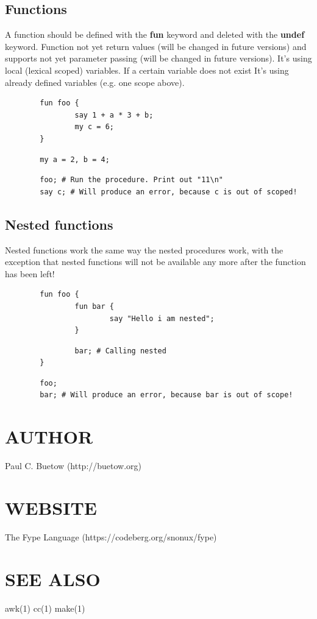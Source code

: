 \subsection*{Functions\label{Functions}}


A function should be defined with the \textbf{fun} keyword and deleted with the \textbf{undef} keyword. Function not yet return values (will be changed in future versions) and supports not yet parameter passing (will be changed in future versions). It's using local (lexical scoped) variables. If a certain variable does not exist It's using already defined variables (e.g. one scope above).

\begin{verbatim}
        fun foo {
                say 1 + a * 3 + b;
                my c = 6;
        }
\end{verbatim}
\begin{verbatim}
        my a = 2, b = 4;
\end{verbatim}
\begin{verbatim}
        foo; # Run the procedure. Print out "11\n"
        say c; # Will produce an error, because c is out of scoped!
\end{verbatim}
\subsection*{Nested functions\label{Nested_functions}}


Nested functions work the same way the nested procedures work, with the exception that nested functions will not be available any more after the function has been left!

\begin{verbatim}
        fun foo {
                fun bar {
                        say "Hello i am nested";
                }
\end{verbatim}
\begin{verbatim}
                bar; # Calling nested
        }
\end{verbatim}
\begin{verbatim}
        foo;
        bar; # Will produce an error, because bar is out of scope!
\end{verbatim}
\section{AUTHOR\label{AUTHOR}}


Paul C. Buetow (http://buetow.org)

\section{WEBSITE\label{WEBSITE}}


The Fype Language (https://codeberg.org/snonux/fype)

\section{SEE ALSO\label{SEE_ALSO}}


awk(1) cc(1) make(1)


